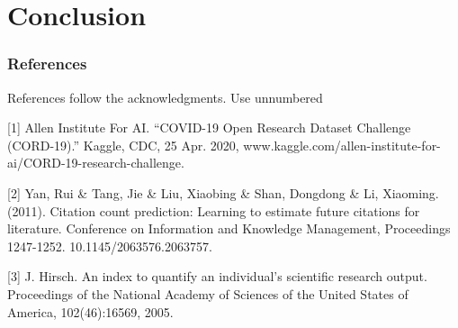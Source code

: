 \documentclass{article} %
\begin{document}
\section{Conclusion}
\label{others}


\subsubsection*{References}

References follow the acknowledgments. Use unnumbered 

\small{
[1] Allen Institute For AI. “COVID-19 Open Research Dataset Challenge (CORD-19).” Kaggle, CDC, 25 Apr. 2020, www.kaggle.com/allen-institute-for-ai/CORD-19-research-challenge.

[2] Yan, Rui \& Tang, Jie \& Liu, Xiaobing \& Shan, Dongdong \& Li, Xiaoming. (2011). Citation count prediction: Learning to estimate future citations for literature. {\itInternational Conference on  Information and Knowledge Management, Proceedings} 1247-1252. 10.1145/2063576.2063757. 

[3] J. Hirsch. An index to quantify an individual’s scientific
research output. Proceedings of the National Academy of
Sciences of the United States of America, 102(46):16569,
2005.
}
\end{document}
